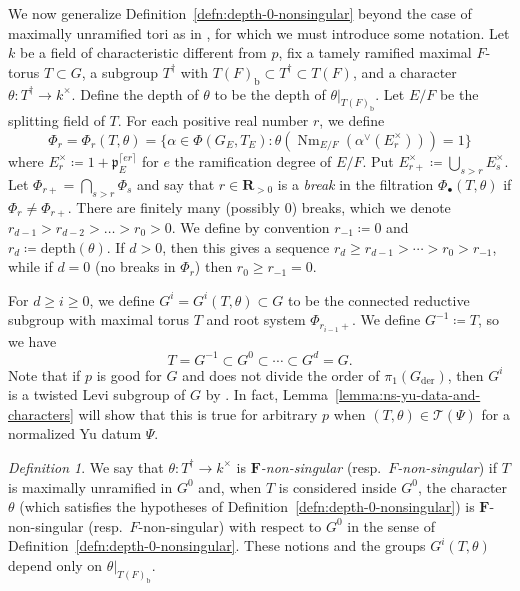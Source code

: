 \documentclass[reqno]{amsart}
\numberwithin{equation}{subsection}
\newcommand{\F}{\mathbf{F}}
\newcommand{\RR}{\mathbf{R}}
\newcommand{\mf}[1]{\mathfrak{#1}}
\newcommand{\co}{\colon}
\newcommand\cT{\mathcal{T}}
\DeclareMathOperator{\Nm}{Nm}
\DeclareMathOperator{\der}{der}
\theoremstyle{remark}
\newtheorem{defn}[thm]{Definition}
\numberwithin{equation}{subsection}
\numberwithin{figure}{subsection}
\begin{document}
We now generalize Definition~\ref{defn:depth-0-nonsingular} beyond the case of maximally unramified tori as in \cite[Definition 3.4.1]{Kal21b}, for which we must introduce some notation. Let $k$ be a field of characteristic different from $p$, fix a tamely ramified maximal $F$-torus $T \subset G$, a subgroup $T^\dagger$ with $T(F)_{\mathrm b}\subset T^\dagger\subset T(F)$, and a character $\theta\co T^\dagger\to k^\times$. Define the depth of $\theta$ to be the depth of $\theta|_{T(F)_{\mathrm b}}$. Let $E/F$ be the splitting field of $T$. For each positive real number $r$, we define
\[
\Phi_r = \Phi_r(T, \theta) = \{ \alpha \in \Phi(G_E, T_E) \co \theta(\Nm_{E/F}(\alpha^\vee (E_r^\times))) = 1 \}
\]
where $E_r^\times \coloneqq 1 + \mf{p}_E^{\lceil e r \rceil}$ for $e$ the ramification degree of $E/F$. Put $E_{r+}^\times\coloneqq\bigcup_{s>r}E_s^\times$. Let $\Phi_{r+} = \bigcap_{s>r} \Phi_s$ and say that $r \in \RR_{>0}$ is a \emph{break} in the filtration $\Phi_\bullet(T,\theta)$ if $\Phi_r \neq \Phi_{r+}$. There are finitely many (possibly $0$) breaks, which we denote $r_{d-1} > r_{d-2} > \ldots  > r_0 > 0$. We define by convention $r_{-1} \coloneqq 0$ and $r_d \coloneqq \mathrm{depth}(\theta)$. If $d>0$, then this gives a sequence $r_d \geq r_{d-1} > \cdots > r_0 > r_{-1}$, while if $d=0$ (no breaks in $\Phi_r$) then $r_0 \geq r_{-1} = 0$.

For $d \geq i \geq 0$, we define $G^i = G^i(T,\theta) \subset G$ to be the connected reductive subgroup with maximal torus $T$ and root system $\Phi_{r_{i-1}+}$. We define $G^{-1} \coloneqq T$, so we have 
\[
T = G^{-1}  \subset G^0 \subset \cdots \subset G^d = G.
\]
Note that if $p$ is good for $G$ and does not divide the order of $\pi_1(G_{\der})$, then $G^i$ is a twisted Levi subgroup of $G$ by \cite[Lemma 3.6.1]{Kal19}. In fact, Lemma~\ref{lemma:ns-yu-data-and-characters} will show that this is true for arbitrary $p$ when $(T, \theta) \in \cT(\Psi)$ for a normalized Yu datum $\Psi$.

\begin{defn}\label{defn:non-singular}
We say that $\theta\co T^\dagger\to k^\times$ is \emph{$\F$-non-singular} (resp.\ \textit{$F$-non-singular}) if $T$ is maximally unramified in $G^0$ and, when $T$ is considered inside $G^0$, the character $\theta$ (which satisfies the hypotheses of Definition~\ref{defn:depth-0-nonsingular}) is $\F$-non-singular (resp.\ $F$-non-singular) with respect to $G^0$ in the sense of Definition~\ref{defn:depth-0-nonsingular}. These notions and the groups $G^i(T,\theta)$ depend only on $\theta|_{T(F)_{\mathrm b}}$.
\end{defn}
\end{document}
